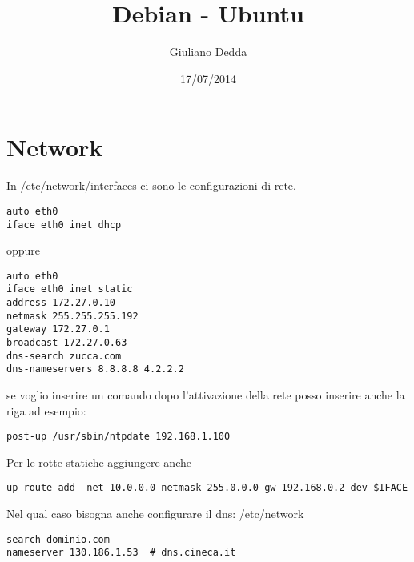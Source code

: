 \documentclass[]{article}
\title{Debian - Ubuntu}
\author{Giuliano Dedda}
\date{17/07/2014}
\begin{document}
\maketitle

\section{Network}\label{network}

In /etc/network/interfaces ci sono le configurazioni di rete.

\begin{verbatim}
auto eth0
iface eth0 inet dhcp
\end{verbatim}

oppure

\begin{verbatim}
auto eth0
iface eth0 inet static
address 172.27.0.10
netmask 255.255.255.192
gateway 172.27.0.1
broadcast 172.27.0.63
dns-search zucca.com
dns-nameservers 8.8.8.8 4.2.2.2
\end{verbatim}

se voglio inserire un comando dopo l'attivazione della rete posso
inserire anche la riga ad esempio:

\begin{verbatim}
post-up /usr/sbin/ntpdate 192.168.1.100
\end{verbatim}

Per le rotte statiche aggiungere anche

\begin{verbatim}
up route add -net 10.0.0.0 netmask 255.0.0.0 gw 192.168.0.2 dev $IFACE
\end{verbatim}

Nel qual caso bisogna anche configurare il dns: /etc/network

\begin{verbatim}
search dominio.com
nameserver 130.186.1.53  # dns.cineca.it
\end{verbatim}
\end{document}
